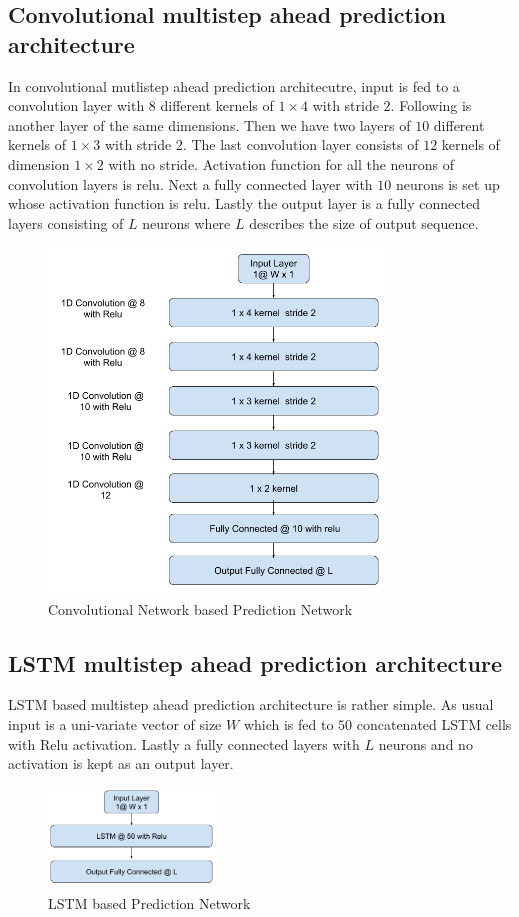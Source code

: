\documentclass[12pt]{article}
\begin{document}
\subsection{Convolutional multistep ahead prediction architecture}
In convolutional mutlistep ahead prediction architecutre, input is fed to a convolution layer with $8$ different kernels of $1 \times 4$ with stride $2$. Following is another layer of the same dimensions. Then we have two layers of $10$ different kernels of $1 \times 3$ with stride $2$. The last convolution layer consists of $12$ kernels of dimension $1 \times 2$ with no stride. Activation function for all the neurons of convolution layers is relu. Next a fully connected layer with $10$ neurons is set up whose activation function is relu. Lastly the output layer is a fully connected layers consisting of $L$ neurons where $L$ describes the size of output sequence.
\begin{figure}[H]
\centering
        \includegraphics[width=0.8\textwidth]{images/architecture/CnnMultistepPrediction.png}
    \caption{Convolutional Network based Prediction Network}
    \label{generalAnomalyDetectionFrameWork}
\end{figure}
\subsection{LSTM multistep ahead prediction architecture}
LSTM based multistep ahead prediction architecture is rather simple. As usual input is a uni-variate vector of size  $W$ which is fed to $50$ concatenated LSTM cells with Relu activation. Lastly a fully connected layers with $L$ neurons and no activation is kept as an output layer.
\begin{figure}[H]
\centering
        \includegraphics[width=0.4\textwidth]{images/architecture/LstmMultistepaheadPrediction.png}
    \caption{LSTM based Prediction Network}
    \label{generalAnomalyDetectionFrameWork}
\end{figure}
\end{document}

